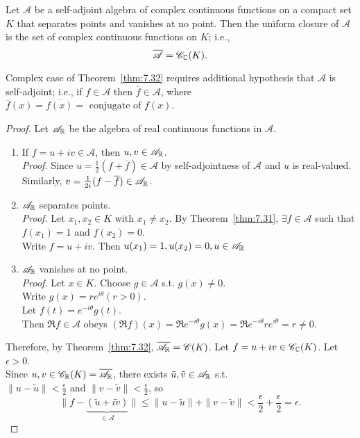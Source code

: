 \begin{thm}
	Let $\mathscr{A}$ be a self-adjoint algebra of complex continuous functions on a compact set $K$ that separates points and vanishes at no point. Then the uniform closure of $\mathscr{A}$ is the set of complex continuous functions on $K$; i.e.,\[
		\overline{\mathscr{A}}=\mathscr{C}_{\mathbb{C}}(K)
	.\] 
	\begin{note}
	Complex case of Theorem~\ref{thm:7.32} requires additional hypothesis that $\mathscr{A}$ is self-adjoint; i.e., if $f \in \mathscr{A}$ then $\overline{f}  \in \mathscr{A}$, where $\overline{f}(x) = \overline{f(x)}= \text{ conjugate of } f(x)$.
	\end{note}
	\begin{proof}
		Let $\mathscr{A}_{\mathbb{R}}$ be the algebra of real continuous functions in $\mathscr{A}$.
		\begin{enumerate}[label=(\roman*)]
			\item If $f=u+iv \in \mathscr{A}$, then $u,v \in \mathscr{A}_{\mathbb{R}}$.\\
				\textit{Proof.}  Since $u=\frac{1}{2}(f+\overline{f}) \in \mathscr{A}$ by self-adjointness of $\mathscr{A}$ and $u$ is real-valued.
				Similarly, $v=\frac{1}{2i}(f-\overline{f}) \in \mathscr{A}_{\mathbb{R}}$.
			\item $\mathscr{A}_{\mathbb{R}}$ separates points.\\
				\textit{Proof.} Let $x_{1},x_{2} \in K$ with $x_{1}\neq x_{2}$. 
				By Theorem~\ref{thm:7.31}, $\exists{f \in \mathscr{A}}$ such that $f(x_{1})=1$ and $f(x_{2})=0$.\\
				Write $f=u+iv$. Then $u(x_{1})=1,u(x_{2})=0,u \in \mathscr{A}_{\mathbb{R}}$
			\item $\mathscr{A}_{\mathbb{R}}$ vanishes at no point.\\
				\textit{Proof.} Let $x \in K$. Choose $g \in \mathscr{A}$ s.t. $g(x)\neq 0$.\\
				Write $g(x)=re^{i\theta}(r>0)$.\\
				Let $f(t)=e^{-i \theta}g(t)$.\\
				Then $\Re{f} \in \mathscr{A}$ obeys $(\Re{f})(x)=\Re{e^{-i \theta}g(x)}=\Re{e^{-i \theta}r e^{i \theta}}=r \neq 0$.
		\end{enumerate}
		Therefore, by Theorem~\ref{thm:7.32}, $\overline{\mathscr{A}_{\mathbb{R}}}=\mathscr{C}(K)$.
		Let $f= u+iv \in \mathscr{C}_{\mathbb{C}}(K)$. Let $\epsilon>0$.\\
		Since $u,v \in \mathscr{C}_{\mathbb{R}}(K)=\overline{\mathscr{A}_{\mathbb{R}}}$, there exists $\tilde{u},\tilde{v} \in \mathscr{A}_{\mathbb{R}}$ s.t. $\|u-\tilde{u}\|<\frac{\epsilon}{2} \text{ and } \|v-\tilde{v}\|<\frac{\epsilon}{2}$, so \[
			\|f-\underbrace{(\tilde{u}+i\tilde{v})}_{\in \mathscr{A}}\|\le \|u-\tilde{u}\|+\|v-\tilde{v}\|<\frac{\epsilon}{2}+\frac{\epsilon}{2}=\epsilon
		.\] 
	\end{proof}
\end{thm}
